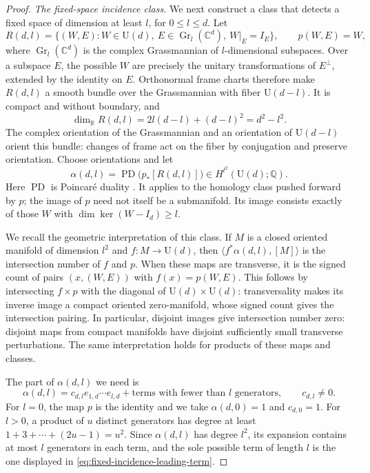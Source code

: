 \begin{proof}
\smallskip\noindent
\emph{The fixed-space incidence class.}
We next construct a class that detects a fixed space of dimension at
least $l$, for $0\leq l\leq d$.  Let
\[
 R(d,l)=\{(W,E): W\in\mathrm U(d),\ E\in
        \operatorname{Gr}_l(\mathbb C^d),\ W|_E=I_E\},
 \qquad p(W,E)=W,
\]
where $\operatorname{Gr}_l(\mathbb C^d)$ is the complex Grassmannian of
$l$-dimensional subspaces.  Over a subspace $E$, the possible $W$ are
precisely the unitary transformations of $E^\perp$, extended by the
identity on $E$.  Orthonormal frame charts therefore make $R(d,l)$ a
smooth bundle over the Grassmannian with fiber $\mathrm U(d-l)$.
It is compact and without boundary, and
\[
 \dim_{\mathbb R}R(d,l)=2l(d-l)+(d-l)^2=d^2-l^2.
\]
The complex orientation of the Grassmannian and an orientation of
$\mathrm U(d-l)$ orient this bundle: changes of frame act on the fiber
by conjugation and preserve orientation.  Choose orientations and let
\[
 \alpha(d,l)=\operatorname{PD}\bigl(p_*[R(d,l)]\bigr)
        \in H^{l^2}(\mathrm U(d);\mathbb Q).
\]
Here $\operatorname{PD}$ is Poincar\'e duality
\cite[Theorem~3.30]{Hatcher2002}.  It applies to the
homology class pushed forward by $p$; the image of $p$ need not itself be
a submanifold.  Its image consists exactly of those $W$ with
$\dim\ker(W-I_d)\geq l$.

We recall the geometric interpretation of this class.  If $M$ is a
closed oriented manifold of dimension $l^2$ and $f:M\to\mathrm U(d)$,
then $\langle f^*\alpha(d,l),[M]\rangle$ is the intersection number of
$f$ and $p$.  When these maps are transverse, it is the signed count of
pairs $(x,(W,E))$ with $f(x)=p(W,E)$.  This follows by intersecting
$f\times p$ with the diagonal of $\mathrm U(d)\times\mathrm U(d)$:
transversality makes its inverse image a compact oriented zero-manifold,
whose signed count gives the intersection pairing.
In particular, disjoint images give intersection number zero: disjoint
maps from compact manifolds have disjoint sufficiently small transverse
perturbations.  The same interpretation holds for products of these
maps and classes.

The part of $\alpha(d,l)$ we need is
\begin{equation}\label{eq:fixed-incidence-leading-term}
 \alpha(d,l)=c_{d,l}e_{1,d}\cdots e_{l,d}
       +\text{terms with fewer than $l$ generators},
 \qquad c_{d,l}\ne0.
\end{equation}
For $l=0$, the map $p$ is the identity and we take
$\alpha(d,0)=1$ and $c_{d,0}=1$.
For $l>0$, a product of $u$ distinct generators has degree at least
$1+3+\cdots+(2u-1)=u^2$.  Since $\alpha(d,l)$ has degree $l^2$, its
expansion contains at most $l$ generators in each term, and the sole
possible term of length $l$ is the one displayed in
\eqref{eq:fixed-incidence-leading-term}.


\end{proof}
